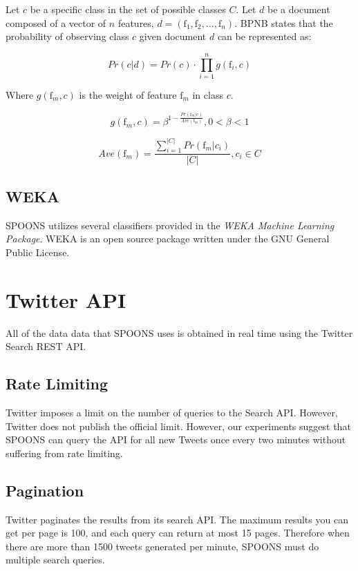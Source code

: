 \documentclass[12pt]{ucthesis}
\begin{document}
Let $c$ be a specific class in the set of possible classes $C$.
Let $d$ be a document composed of a vector of $n$ features, $d = (\textrm{f}_{1}, \textrm{f}_{2}, ..., \textrm{f}_{n})$.
BPNB states that the probability of observing class $c$ given document $d$
can be represented as:

\begin{equation}
   Pr(c|d) = Pr(c) \cdot \prod_{i = 1}^{n}g(\textrm{f}_{i},c)
\end{equation}

Where $g(\textrm{f}_{m}, c)$ is the weight of feature $\textrm{f}_m$ in class $c$.

\begin{equation}
   g(\textrm{f}_m, c) = \beta^{1 - \frac{Pr(\textrm{f}_m|c)}{Ave(\textrm{f}_m)}}, 0 < \beta < 1
\end{equation}

\begin{equation}
   Ave(\textrm{f}_m) = \frac{\sum_{i=1}^{|C|} Pr(\textrm{f}_m|c_{i})}{|C|}, c_i \in C
\end{equation}

\section{WEKA}
\label{background-weka}
SPOONS utilizes several classifiers provided in the \textit{WEKA Machine Learning Package}.
WEKA is an open source package written under the GNU General Public License\cite{weka}.

\chapter{Twitter API}
\label{background-twitter-api}
All of the data data that SPOONS uses is obtained in real time using the Twitter Search REST API\cite{TwitterAPI}.

\section{Rate Limiting}
\label{api-rate-limit}
Twitter imposes a limit on the number of queries to the Search API. However, Twitter does not publish the official
limit. However, our experiments suggest that SPOONS can query the API for all new Tweets once every two minutes without
suffering from rate limiting.

\section{Pagination}
\label{api-pagination}
Twitter paginates the results from its search API. The maximum results you can get per page is 100, and each
query can return at most 15 pages. Therefore when there are more than 1500 tweets generated per minute,
SPOONS must do multiple search queries.
\end{document}
